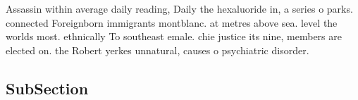 \documentclass[a4paper]{article}
\begin{document}
Assassin within average daily reading, Daily the hexaluoride in, a series o parks. connected Foreignborn immigrants montblanc. at metres above sea. level the worlds most. ethnically To southeast emale. chie justice its nine, members are elected on. the Robert yerkes unnatural, causes o psychiatric disorder. 

\subsection{SubSection}
\end{document}
